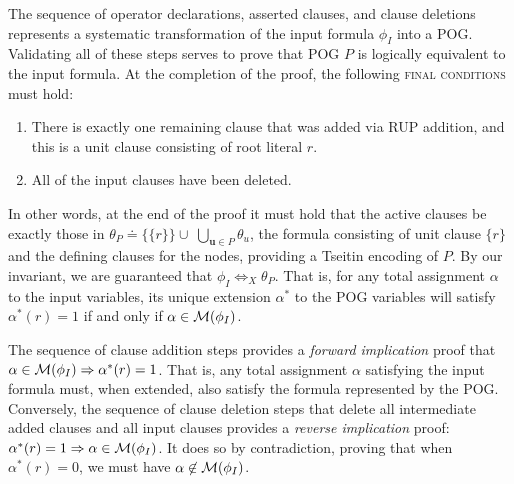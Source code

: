 \documentclass[twoside,11pt]{article}
\newcommand{\varset}{X}
\newcommand{\imply}{\Rightarrow}
\newcommand{\ifandonlyif}{\Leftrightarrow}
\newcommand{\eequiv}{\ifandonlyif_{\varset}}
\newcommand{\extend}[1]{#1^{*}}
\newcommand{\assign}{\alpha}
\newcommand{\eassign}{\extend{\alpha}}
\newcommand{\modelset}{{\cal M}}
\newcommand{\inputformula}{\phi_I}
\newcommand{\pogformula}{\theta_P}
\newcommand{\makenode}[1]{\mathbf{#1}}
\newcommand{\nodeu}{\makenode{u}}
\begin{document}

The sequence of operator declarations, asserted clauses, and
clause deletions represents a systematic transformation of the input formula $\inputformula$
into a POG\@.  Validating all of these steps serves to prove that
POG $P$ is logically equivalent to the input formula.
At the completion of the proof, the following \textsc{final conditions} must hold:
\begin{enumerate}
\item There is exactly one remaining clause that was added via RUP
  addition, and this is a unit clause consisting of root literal $r$.
\item All of the input clauses have been deleted.
\end{enumerate}
In other words, at the end of the proof it must hold that the active
clauses be exactly those in $\pogformula \doteq \{\{r\}\} \cup \;
\bigcup_{\nodeu \in P} \theta_{u}$, the formula consisting of unit
clause $\{r\}$ and the defining clauses for the nodes, providing a
Tseitin encoding of $P$.  By our invariant, we are guaranteed that
$\inputformula \eequiv \pogformula$.  That is, for any total
assignment $\assign$ to the input variables, its unique extension 
$\eassign$ to the POG variables will satisfy $\eassign(r) = 1$ if and only if
$\assign \in \modelset(\inputformula)$.

The sequence of clause addition steps provides a \emph{forward implication} proof that
$\assign \in \modelset(\inputformula) \imply \eassign(r) = 1$.  That is, any total
assignment $\assign$ satisfying the input formula must, when extended, also satisfy
the formula represented by the POG\@.
Conversely,
the sequence of clause deletion steps that delete all intermediate added clauses and all input clauses
provides a \emph{reverse implication} proof:
$\eassign(r) = 1 \imply \assign \in \modelset(\inputformula)$.
It does so by contradiction, proving that when $\eassign(r) = 0$, we must have $\assign \not \in \modelset(\inputformula)$.
\end{document}
